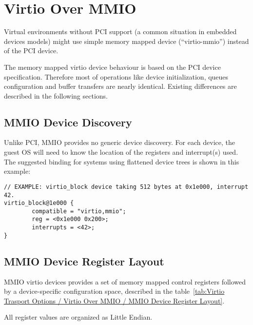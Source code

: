 \section{Virtio Over MMIO}\label{sec:Virtio Transport Options / Virtio Over MMIO}

Virtual environments without PCI support (a common situation in
embedded devices models) might use simple memory mapped device
(``virtio-mmio'') instead of the PCI device.

The memory mapped virtio device behaviour is based on the PCI
device specification. Therefore most of operations like device
initialization, queues configuration and buffer transfers are
nearly identical. Existing differences are described in the
following sections.

\subsection{MMIO Device Discovery}\label{sec:Virtio Transport Options / Virtio Over MMIO / MMIO Device Discovery}

Unlike PCI, MMIO provides no generic device discovery.  For each
device, the guest OS will need to know the location of the registers
and interrupt(s) used.  The suggested binding for systems using
flattened device trees is shown in this example:

\begin{lstlisting}
// EXAMPLE: virtio_block device taking 512 bytes at 0x1e000, interrupt 42.
virtio_block@1e000 {
        compatible = "virtio,mmio";
        reg = <0x1e000 0x200>;
        interrupts = <42>;
}
\end{lstlisting}

\subsection{MMIO Device Register Layout}\label{sec:Virtio Transport Options / Virtio Over MMIO / MMIO Device Register Layout}

MMIO virtio devices provides a set of memory mapped control
registers followed by a device-specific configuration space,
described in the table~\ref{tab:Virtio Trasport Options / Virtio Over MMIO / MMIO Device Register Layout}.

All register values are organized as Little Endian.

\newcommand{\mmioreg}[5]{%
  {\field{#1}} \newline #3 \newline #4 & {\bf#2} \newline #5 \\
}

